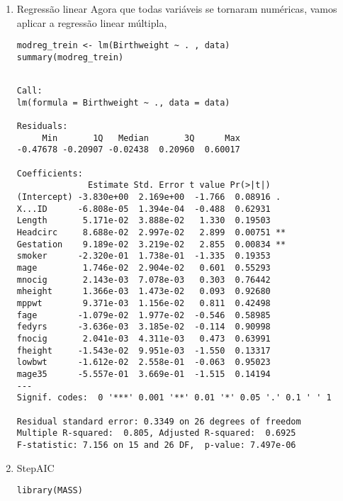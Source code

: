 \documentclass[11pt]{article}
\begin{document}
\begin{enumerate}
\item Regressão linear
\label{sec:org328bfbd}
Agora que todas variáveis se tornaram numéricas, vamos aplicar a regressão linear múltipla,

\begin{verbatim}
modreg_trein <- lm(Birthweight ~ . , data)
summary(modreg_trein)
\end{verbatim}

\begin{verbatim}

Call:
lm(formula = Birthweight ~ ., data = data)

Residuals:
     Min       1Q   Median       3Q      Max 
-0.47678 -0.20907 -0.02438  0.20960  0.60017 

Coefficients:
              Estimate Std. Error t value Pr(>|t|)   
(Intercept) -3.830e+00  2.169e+00  -1.766  0.08916 . 
X...ID      -6.808e-05  1.394e-04  -0.488  0.62931   
Length       5.171e-02  3.888e-02   1.330  0.19503   
Headcirc     8.688e-02  2.997e-02   2.899  0.00751 **
Gestation    9.189e-02  3.219e-02   2.855  0.00834 **
smoker      -2.320e-01  1.738e-01  -1.335  0.19353   
mage         1.746e-02  2.904e-02   0.601  0.55293   
mnocig       2.143e-03  7.078e-03   0.303  0.76442   
mheight      1.366e-03  1.473e-02   0.093  0.92680   
mppwt        9.371e-03  1.156e-02   0.811  0.42498   
fage        -1.079e-02  1.977e-02  -0.546  0.58985   
fedyrs      -3.636e-03  3.185e-02  -0.114  0.90998   
fnocig       2.041e-03  4.311e-03   0.473  0.63991   
fheight     -1.543e-02  9.951e-03  -1.550  0.13317   
lowbwt      -1.612e-02  2.558e-01  -0.063  0.95023   
mage35      -5.557e-01  3.669e-01  -1.515  0.14194   
---
Signif. codes:  0 '***' 0.001 '**' 0.01 '*' 0.05 '.' 0.1 ' ' 1

Residual standard error: 0.3349 on 26 degrees of freedom
Multiple R-squared:  0.805,	Adjusted R-squared:  0.6925 
F-statistic: 7.156 on 15 and 26 DF,  p-value: 7.497e-06

\end{verbatim}

\item StepAIC
\label{sec:orge70615a}
\begin{verbatim}
library(MASS)
\end{verbatim}


\end{enumerate}
\end{document}

